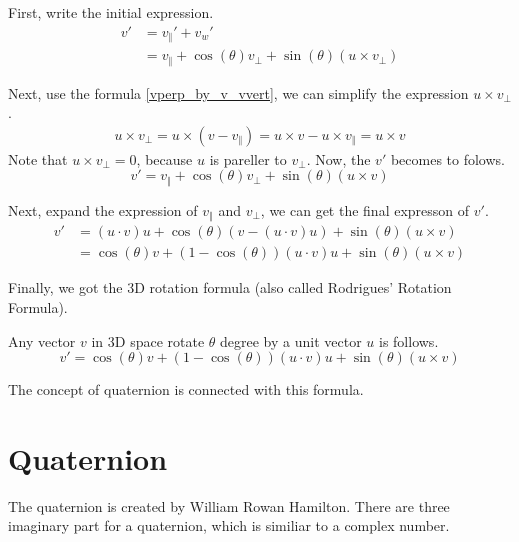\documentclass[runningheads,a4paper,english]{llncs}[2022/01/12]
\begin{document}
First, write the initial expression.
\begin{equation}
  \begin{aligned}
  v'&=v_{\Vert}'+v_w'\\
    &=v_{\Vert} +\cos(\theta)v_{\perp}+\sin(\theta)(u\times v_{\perp})
  \end{aligned}
\end{equation}

Next, use the formula \eqref{vperp_by_v_vvert}, we can simplify the expression $u\times v_{\perp}$.
\begin{equation}
  \begin{aligned}
    u\times v_{\perp}=u\times (v-v_{\Vert})=u\times v - u\times v_{\Vert} = u\times v
  \end{aligned}
\end{equation}
Note that $u\times v_{\perp}=0$, because $u$ is pareller to $v_{\perp}$.
Now, the $v'$ becomes to folows.
\begin{equation}
  v'=v_{\Vert} +\cos(\theta)v_{\perp}+\sin(\theta)(u\times v)
\end{equation}

Next, expand the expression of $v_{\Vert}$ and $v_{\perp}$, we can get the final expresson of $v'$.
\begin{equation}
  \begin{aligned}
    v'&=(u\cdot v)u +\cos(\theta)(v-(u\cdot v)u)+\sin(\theta)(u\times v)\\
      &=\cos(\theta)v+(1-\cos(\theta))(u\cdot v)u+\sin(\theta)(u\times v)
  \end{aligned}
\end{equation}

Finally, we got the 3D rotation formula (also called Rodrigues' Rotation Formula).
\begin{theorem}
  Any vector $v$ in 3D space rotate $\theta$ degree by a unit vector $u$ is follows.
  \begin{equation}
    v'=\cos(\theta)v+(1-\cos(\theta))(u\cdot v)u+\sin(\theta)(u\times v)
  \end{equation}
\end{theorem}
The concept of quaternion is connected with this formula.


\section{Quaternion}
The quaternion is created by William Rowan Hamilton.
There are three imaginary part for a quaternion, which is similiar to a complex number.
\end{document}
